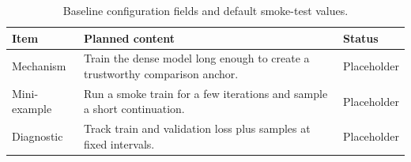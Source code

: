\begin{table}[H]
\centering
\caption{Baseline configuration fields and default smoke-test values.}
\label{tab:ch02-training-loop-and-sampling-baseline}
\begin{tabularx}{\textwidth}{p{}X p{}}
\toprule
Item & Planned content & Status \\
\midrule
Mechanism & Train the dense model long enough to create a trustworthy comparison anchor. & Placeholder \\
Mini-example & Run a smoke train for a few iterations and sample a short continuation. & Placeholder \\
Diagnostic & Track train and validation loss plus samples at fixed intervals. & Placeholder \\
\bottomrule
\end{tabularx}
\end{table}
